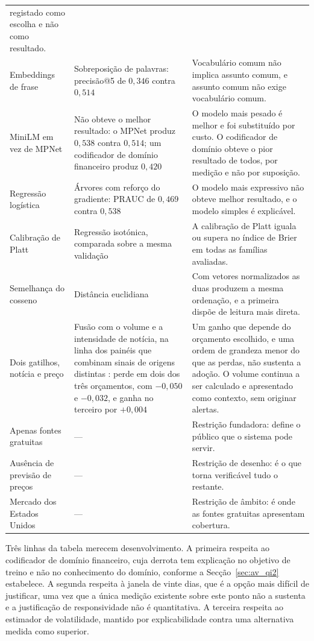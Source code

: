 \begin{table}[!htbp]
\begin{tabular}{L{0.19\textwidth} L{0.30\textwidth} L{0.39\textwidth}}
registado como escolha e não como resultado. \\
\addlinespace
Embeddings de frase & Sobreposição de palavras: precisão@5 de $0{,}346$ contra $0{,}514$ &
Vocabulário comum não implica assunto comum, e assunto comum não exige vocabulário comum. \\
\addlinespace
MiniLM em vez de MPNet & Não obteve o melhor resultado: o MPNet produz $0{,}538$ contra $0{,}514$; um
codificador de domínio financeiro produz $0{,}420$ & O modelo mais pesado é melhor e foi substituído
por custo. O codificador de domínio obteve o pior resultado de todos, por medição e não por
suposição. \\
\addlinespace
Regressão logística & Árvores com reforço do gradiente: \gls{PRAUC} de $0{,}469$ contra $0{,}538$ &
O modelo mais expressivo não obteve melhor resultado, e o modelo simples é explicável. \\
\addlinespace
Calibração de Platt & Regressão isotónica, comparada sobre a mesma validação & A calibração de Platt
iguala ou supera no índice de Brier em todas as famílias avaliadas. \\
\addlinespace
Semelhança do cosseno & Distância euclidiana & Com vetores normalizados as duas produzem a mesma
ordenação, e a primeira dispõe de leitura mais direta. \\
\addlinespace
Dois gatilhos, notícia e preço & Fusão com o volume e a intensidade de notícia, na linha dos painéis
que combinam sinais de origens distintas \autocite{worldmonitor2026}: perde em dois dos três
orçamentos, com $-0{,}050$ e $-0{,}032$, e ganha no terceiro por $+0{,}004$ & Um ganho que depende do
orçamento escolhido, e uma ordem de grandeza menor do que as perdas, não sustenta a adoção. O volume
continua a ser calculado e apresentado como contexto, sem originar alertas. \\
\midrule
Apenas fontes gratuitas & --- & Restrição fundadora: define o público que o sistema pode servir. \\
Ausência de previsão de preços & --- & Restrição de desenho: é o que torna verificável tudo o
restante. \\
Mercado dos Estados Unidos & --- & Restrição de âmbito: é onde as fontes gratuitas apresentam
cobertura. \\
\bottomrule
\end{tabular}
\end{table}

Três linhas da tabela merecem desenvolvimento. A primeira respeita ao codificador de domínio
financeiro, cuja derrota tem explicação no objetivo de treino e não no conhecimento do domínio,
conforme a Secção~\ref{sec:av_qi2} estabelece. A segunda respeita à janela de vinte dias, que é a
opção mais difícil de justificar, uma vez que a única medição existente sobre este ponto não a
sustenta e a justificação de responsividade não é quantitativa. A terceira respeita ao estimador de
volatilidade, mantido por explicabilidade contra uma alternativa medida como superior.

